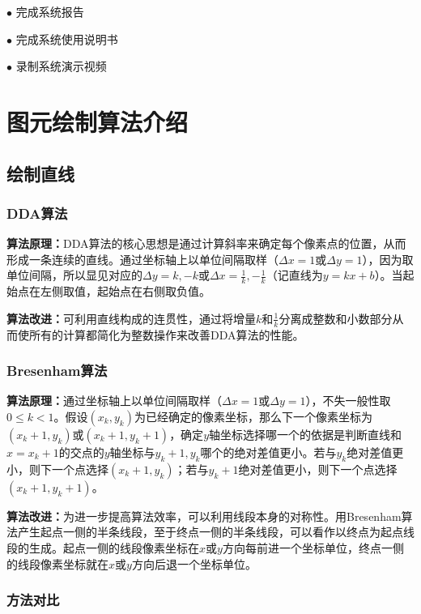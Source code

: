 \documentclass[a4paper,UTF8]{article}
\theoremstyle{definition}
\begin{document}
$\bullet$ 完成系统报告

$\bullet$ 完成系统使用说明书

$\bullet$ 录制系统演示视频

\section{图元绘制算法介绍}

\subsection{绘制直线}

\subsubsection{DDA算法}

\textbf{算法原理：}DDA算法的核心思想是通过计算斜率来确定每个像素点的位置，从而形成一条连续的直线。通过坐标轴上以单位间隔取样（$\Delta x = 1$或$\Delta y = 1$），因为取单位间隔，所以显见对应的$\Delta y = k, -k$或$\Delta x = \frac{1}{k},-\frac{1}{k}$（记直线为$y=kx+b$）。当起始点在左侧取值，起始点在右侧取负值。

\textbf{算法改进：}可利用直线构成的连贯性，通过将增量$k$和$\frac{1}{k}$分离成整数和小数部分从而使所有的计算都简化为整数操作来改善DDA算法的性能。

\subsubsection{Bresenham算法}

\textbf{算法原理：}通过坐标轴上以单位间隔取样（$\Delta x = 1$或$\Delta y = 1$），不失一般性取$0\leq k<1$。假设$(x_k,y_k)$为已经确定的像素坐标，那么下一个像素坐标为$(x_{k}+1,y_k)$或$(x_k+1,y_k+1)$，确定$y$轴坐标选择哪一个的依据是判断直线和$x=x_k+1$的交点的$y$轴坐标与$y_k+1,y_k$哪个的绝对差值更小。若与$y_k$绝对差值更小，则下一个点选择$(x_k+1,y_k)$；若与$y_k+1$绝对差值更小，则下一个点选择$(x_k+1,y_k+1)$。

\textbf{算法改进：}为进一步提高算法效率，可以利用线段本身的对称性。用Bresenham算法产生起点一侧的半条线段，至于终点一侧的半条线段，可以看作以终点为起点线段的生成。起点一侧的线段像素坐标在$x$或$y$方向每前进一个坐标单位，终点一侧的线段像素坐标就在$x$或$y$方向后退一个坐标单位。

\subsubsection{方法对比}
\end{document}
